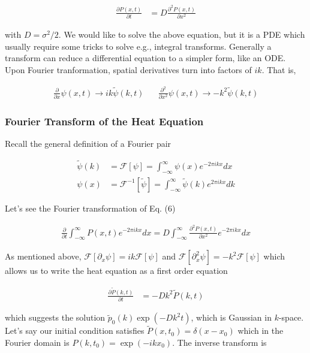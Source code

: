 \documentclass{article}
\begin{document}
\begin{align}
\frac{\partial P(x,t)}{\partial t}  &= D\frac{\partial^{2}P(x,t)}{\partial x^{2}}
\end{align}

with $D = \sigma^{2}/2$. We would like to solve the above equation, but it is a PDE which usually require some tricks to solve e.g., integral transforms. Generally a transform can reduce a differential equation to a simpler form, like an ODE. Upon Fourier tranformation, spatial derivatives turn into factors of $ik$. That is, 

\begin{align*}
\frac{\partial}{\partial x} \psi(x,t) \rightarrow ik\tilde{\psi}(k,t)\;\;\;\;\;\; \frac{\partial^{2}}{\partial x^{2}} \psi(x,t) \rightarrow -k^{2}\tilde{\psi}(k,t)
\end{align*}


\subsubsection{Fourier Transform of the Heat Equation}

Recall the general definition of a Fourier pair

\begin{align*}
\tilde{\psi}(k) &= \mathcal{F}[\psi] = \int_{-\infty}^{\infty} \psi(x) e^{-2\pi ikx}dx\\
\psi(x) &= \mathcal{F}^{-1}[\tilde{\psi}] = \int_{-\infty}^{\infty} \tilde{\psi}(k) e^{2\pi ikx}dk
\end{align*}


Let's see the Fourier transformation of Eq. (6)

\begin{align}
\frac{\partial}{\partial t} \int_{-\infty}^{\infty}  P(x,t) e^{-2\pi ikx}dx = D\int_{-\infty}^{\infty} \frac{\partial^{2}P(x,t)}{\partial x^{2}} e^{-2\pi ikx}dx
\end{align}

As mentioned above, $\mathcal{F}[\partial_{x}\psi] = ik \mathcal{F}[\psi]$ and $\mathcal{F}[\partial_{x}^{2}\psi] = -k^{2} \mathcal{F}[\psi]$ which allows us to write the heat equation as a first order equation

\begin{align}
\frac{\partial \tilde{P}(k,t)}{\partial t}  &= -Dk^{2}\tilde{P}(k,t)
\end{align}

which suggests the solution $\tilde{p}_{0}(k) \exp\left(-D k^{2}t\right)$, which is Gaussian in $k$-space. Let's say our initial condition satisfies $\tilde{P}(x,t_{0}) = \delta (x-x_{0})$ which in the Fourier domain is $P(k,t_{0}) = \exp (-ikx_{0})$. The inverse transform is
\end{document}
